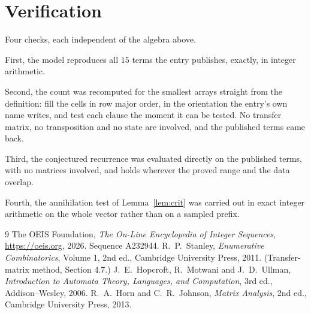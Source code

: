 \documentclass[11pt,a4paper]{article}
\theoremstyle{plain}
\theoremstyle{definition}
\begin{document}
\section{Verification}

Four checks, each independent of the algebra above.

First, the model reproduces all $15$ terms the entry publishes, exactly, in integer
arithmetic.

Second, the count was recomputed for the smallest arrays straight from the definition: fill the
cells in row major order, in the orientation the entry's own name writes, and test each clause
the moment it can be tested. No transfer matrix, no transposition and no state are involved,
and the published terms came back.

Third, the conjectured recurrence was evaluated directly on the published terms, with no
matrices involved, and holds wherever the proved range and the data overlap.

Fourth, the annihilation test of Lemma~\ref{lem:crit} was carried out in exact integer
arithmetic on the whole vector rather than on a sampled prefix.

\begin{thebibliography}{9}
 The OEIS Foundation, \emph{The On-Line Encyclopedia of Integer
Sequences}, \url{https://oeis.org}, 2026. Sequence A232944.
 R.~P.~Stanley, \emph{Enumerative Combinatorics}, Volume 1, 2nd ed.,
Cambridge University Press, 2011. (Transfer-matrix method, Section 4.7.)
 J.~E.~Hopcroft, R.~Motwani and J.~D.~Ullman, \emph{Introduction to Automata
Theory, Languages, and Computation}, 3rd ed., Addison--Wesley, 2006.
 R.~A.~Horn and C.~R.~Johnson, \emph{Matrix Analysis}, 2nd ed., Cambridge
University Press, 2013.
\end{thebibliography}
\end{document}
